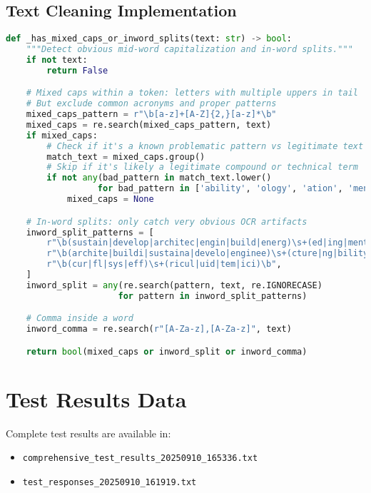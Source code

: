 \documentclass[12pt,a4paper]{article}
\begin{document}
\subsection{Text Cleaning Implementation}
\begin{lstlisting}[language=Python, caption=Complete text cleaning function]
def _has_mixed_caps_or_inword_splits(text: str) -> bool:
    """Detect obvious mid-word capitalization and in-word splits."""
    if not text:
        return False

    # Mixed caps within a token: letters with multiple uppers in tail
    # But exclude common acronyms and proper patterns
    mixed_caps_pattern = r"\b[a-z]+[A-Z]{2,}[a-z]*\b"
    mixed_caps = re.search(mixed_caps_pattern, text)
    if mixed_caps:
        # Check if it's a known problematic pattern vs legitimate text
        match_text = mixed_caps.group()
        # Skip if it's likely a legitimate compound or technical term
        if not any(bad_pattern in match_text.lower() 
                  for bad_pattern in ['ability', 'ology', 'ation', 'ment']):
            mixed_caps = None

    # In-word splits: only catch very obvious OCR artifacts
    inword_split_patterns = [
        r"\b(sustain|develop|architec|engin|build|energ)\s+(ed|ing|ment|t|ture|al|er|y)\b",
        r"\b(archite|buildi|sustaina|develo|enginee)\s+(cture|ng|bility|pment|ring)\b",
        r"\b(cur|fl|sys|eff)\s+(ricul|uid|tem|ici)\b",
    ]
    inword_split = any(re.search(pattern, text, re.IGNORECASE) 
                      for pattern in inword_split_patterns)

    # Comma inside a word
    inword_comma = re.search(r"[A-Za-z],[A-Za-z]", text)

    return bool(mixed_caps or inword_split or inword_comma)
\end{lstlisting}

\section{Test Results Data}

Complete test results are available in:
\begin{itemize}
    \item \texttt{comprehensive\_test\_results\_20250910\_165336.txt}
    \item \texttt{test\_responses\_20250910\_161919.txt}
\end{itemize}
\end{document}
